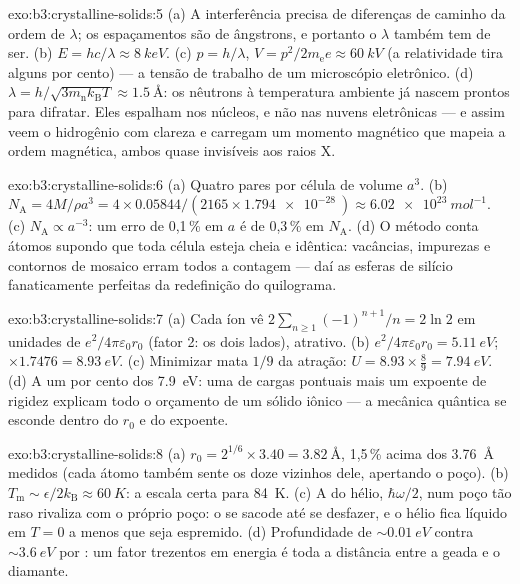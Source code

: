 \begin{solution}{exo:b3:crystalline-solids:5}
(a) A interferência precisa de diferenças de caminho da ordem de $\lambda$;
os espaçamentos são de ângstrons, e portanto o $\lambda$ também tem de
ser. (b) $E =
hc/\lambda \approx \qty{8}{keV}$. (c) $p = h/\lambda$, $V =
p^2/2m_{\text{e}}e \approx \qty{60}{kV}$ (a relatividade tira alguns
por cento) --- a tensão de trabalho de um microscópio eletrônico. (d)
$\lambda = h/\sqrt{3m_{\text{n}}k_{\text{B}}T} \approx
\qty{1.5}{\angstrom}$: os nêutrons à temperatura ambiente já nascem
prontos para difratar. Eles espalham nos núcleos, e não nas nuvens
eletrônicas --- e assim veem o hidrogênio com clareza e carregam um
momento magnético que mapeia a ordem magnética, ambos quase invisíveis
aos raios X.
\end{solution}

\begin{solution}{exo:b3:crystalline-solids:6}
(a) Quatro pares por célula de volume $a^3$. (b) $N_{\text{A}} =
4M/\rho a^3 = 4\times0.05844/(2165\times\qty{1.794e-28}{})
\approx \qty{6.02e23}{mol^{-1}}$. (c) $N_{\text{A}} \propto
a^{-3}$: um erro de 0,1\,\% em $a$ é de 0,3\,\% em $N_{\text{A}}$. (d)
O método conta átomos supondo que toda célula esteja cheia e
idêntica: vacâncias, impurezas e contornos de mosaico erram todos a
contagem --- daí as esferas de silício fanaticamente perfeitas da
redefinição do quilograma.
\end{solution}

\begin{solution}{exo:b3:crystalline-solids:7}
(a) Cada íon vê $2\sum_{n\ge1}(-1)^{n+1}/n = 2\ln2$ em unidades de
$e^2/4\pi\varepsilon_0r_0$ (fator 2: os dois lados), atrativo. (b)
$e^2/4\pi\varepsilon_0r_0 = \qty{5.11}{eV}$; $\times1.7476 =
\qty{8.93}{eV}$. (c) Minimizar mata $1/9$ da atração:
$U = 8.93\times\tfrac89 = \qty{7.94}{eV}$. (d) A um por cento
dos \qty{7.9}{eV}: uma  de cargas pontuais mais um expoente de
rigidez explicam todo o orçamento de um sólido iônico --- a mecânica
quântica se esconde dentro do $r_0$ e do expoente.
\end{solution}

\begin{solution}{exo:b3:crystalline-solids:8}
(a) $r_0 = 2^{1/6}\times3.40 = \qty{3.82}{\angstrom}$, 1,5\,\%
acima dos \qty{3.76}{\angstrom} medidos (cada átomo também sente
os doze vizinhos dele, apertando o poço). (b)
$T_{\text{m}} \sim \epsilon/2k_{\text{B}} \approx \qty{60}{K}$:
a escala certa para \qty{84}{K}. (c) A  do hélio,
$\hbar\omega/2$, num poço tão raso rivaliza com o próprio poço: o
 se sacode até se desfazer, e o hélio fica líquido em $T = 0$
a menos que seja espremido. (d) Profundidade de $\sim\qty{0.01}{eV}$
contra $\sim\qty{3.6}{eV}$ por : um fator trezentos em
energia é toda a distância entre a geada e o diamante.
\end{solution}

